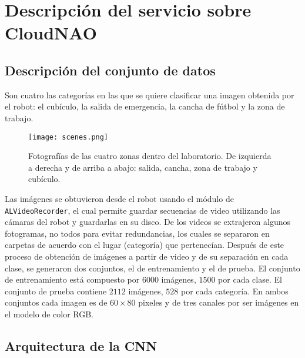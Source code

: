 %
%
%

\section{Descripción del servicio sobre CloudNAO}


\subsection{Descripción del conjunto de datos\label{sec:dataset-def}}

Son cuatro las categorías en las que se quiere
clasificar una imagen obtenida por el robot: el cubículo,
la salida de emergencia, la cancha de fútbol y la zona de trabajo.

\begin{figure}[ht]
    \centering
    \texttt{[image: scenes.png]}
    \caption{Fotografías de las cuatro zonas dentro del laboratorio. De izquierda a derecha y
    de arriba a abajo: salida, cancha, zona de trabajo y cubículo.
    }
    \label{fig:scenes}
\end{figure}

Las imágenes se obtuvieron desde el robot usando el módulo de
\texttt{ALVideoRecorder},
el cual permite guardar secuencias de video utilizando las cámaras del robot y guardarlas 
en su disco. De los videos se extrajeron algunos fotogramas, no todos para evitar
redundancias, los cuales se separaron en carpetas
de acuerdo con el lugar (categoría) que pertenecían. Después de este proceso
de obtención de imágenes a partir de video y de su separación en cada clase, se
generaron dos conjuntos, el de entrenamiento y el de prueba. El conjunto 
de entrenamiento está compuesto por $6000$ imágenes, $1500$ por cada clase.
El conjunto de prueba contiene $2112$ imágenes, $528$ por cada categoría.
En ambos conjuntos cada imagen es de $60 \times  80$ pixeles y de tres canales por ser imágenes en el modelo de color RGB.



\subsection{Arquitectura de la CNN}

